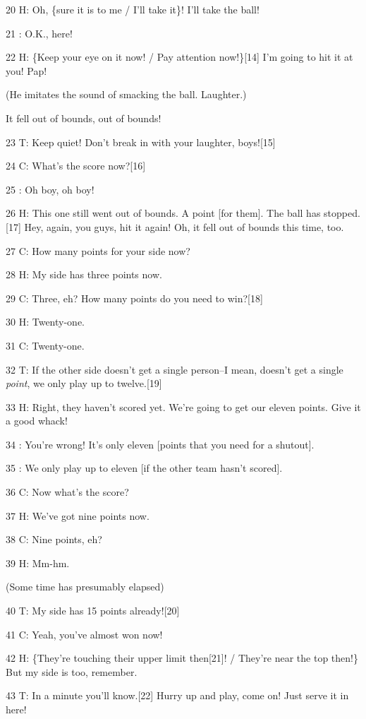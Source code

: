20 H: Oh, \{sure it is to me / I'll take it\}! I'll take the ball!

21    : O.K., here!

22 H: \{Keep your eye on it now! / Pay attention now!\}[14] I'm going to hit it
at you! Pap!

(He imitates the sound of smacking the ball. Laughter.)

It fell out of bounds, out of bounds!

23 T: Keep quiet! Don't break in with your laughter, boys![15]

24 C: What's the score now?[16]

25    : Oh boy, oh boy!

26 H: This one still went out of bounds. A point [for them]. The ball has stopped.[17]
Hey, again, you guys, hit it again! Oh, it fell out of bounds this time, too.

27 C: How many points for your side now?

28 H: My side has three points now.

29 C: Three, eh? How many points do you need to win?[18]

30 H: Twenty-one.

31 C: Twenty-one.

32 T: If the other side doesn't get a single person--I mean, doesn't get a single
\textit{point}, we only play up to twelve.[19]

33 H: Right, they haven't scored yet. We're going to get our eleven points. Give
it a good whack!

34    : You're wrong! It's only eleven [points that you need for a shutout].

35    : We only play up to eleven [if the other team hasn't scored].

36 C: Now what's the score?

37 H: We've got nine points now.

38 C: Nine points, eh?

39 H: Mm-hm.

(Some time has presumably elapsed)

40 T: My side has 15 points already![20]

41 C: Yeah, you've almost won now!

42 H: \{They're touching their upper limit then[21]! / They're near the top then!\}
But my side is too, remember.

43 T: In a minute you'll know.[22] Hurry up and play, come on! Just serve it in
here!

